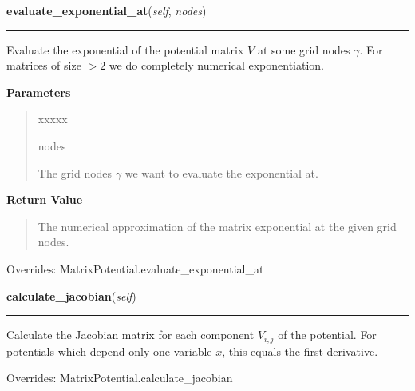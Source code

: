 \hspace{.8\funcindent}\begin{boxedminipage}{\funcwidth}

    \raggedright \textbf{evaluate\_exponential\_at}(\textit{self}, \textit{nodes})

    \vspace{-1.5ex}

    \rule{\textwidth}{0.5\fboxrule}
\setlength{\parskip}{2ex}
    Evaluate the exponential of the potential matrix $V$ at some grid
    nodes $\gamma$. For matrices of size $>
    2$ we do completely numerical exponentiation.

\setlength{\parskip}{1ex}
      \textbf{Parameters}
      \vspace{-1ex}

      \begin{quote}
        \begin{Ventry}{xxxxx}

          \item[nodes]

          The grid nodes $\gamma$ we want to evaluate the
          exponential at.

        \end{Ventry}

      \end{quote}

      \textbf{Return Value}
    \vspace{-1ex}

      \begin{quote}
      The numerical approximation of the matrix exponential at the given
      grid nodes.

      \end{quote}



      Overrides: MatrixPotential.evaluate\_exponential\_at

    \end{boxedminipage}

    \vspace{0.5ex}

\hspace{.8\funcindent}\begin{boxedminipage}{\funcwidth}

    \raggedright \textbf{calculate\_jacobian}(\textit{self})

    \vspace{-1.5ex}

    \rule{\textwidth}{0.5\fboxrule}
\setlength{\parskip}{2ex}
    Calculate the Jacobian matrix for each component $V_{i,j}$ of the
    potential. For potentials which depend only one variable $x$, this
    equals the first derivative.

\setlength{\parskip}{1ex}


      Overrides: MatrixPotential.calculate\_jacobian

    \end{boxedminipage}

